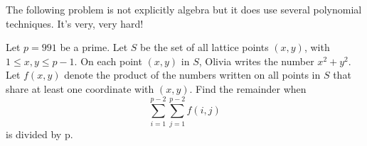 \documentclass{article}
\begin{document}
\begin{remark}
The following problem is not explicitly algebra but it does use several polynomial techniques. It\rq{}s very, very hard!
\end{remark}

\begin{prob}{21}
Let $p = 991$ be a prime. Let $S$ be the set of all lattice points $(x, y)$,
with $1 \leq x, y \leq p - 1$. On each point $(x, y)$ in $S$, Olivia writes the number $x^2 + y^2$. Let
$f(x, y)$ denote the product of the numbers written on all points in $S$ that share at least
one coordinate with $(x, y)$. Find the remainder when
$$\sum_{i=1}^{p-2} \sum_{j=1}^{p-2} f(i,j)$$
is divided by p.
\end{prob}
\end{document}
